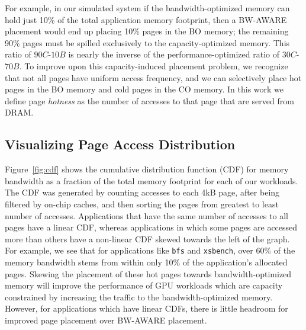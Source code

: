 For example, in our simulated system if the bandwidth-optimized memory
can hold just 10\% of the total application memory footprint, then a BW-AWARE placement would end up placing
10\% pages in the BO memory; the
remaining 90\% pages must be spilled exclusively to the capacity-optimized memory.  This ratio of
$90C$-$10B$ is nearly the inverse of the performance-optimized ratio of $30C$-$70B$.  
To improve upon this capacity-induced placement problem, we recognize
that not all pages have uniform access frequency, and we can selectively place
hot pages in the BO memory and cold pages in the CO memory. 
{\color{black}In this work we define page \textit{hotness} as the number of accesses to that page that 
are served from DRAM.}


\subsection{Visualizing Page Access Distribution}
\label{annotation}
Figure~\ref{fig:cdf} shows the cumulative distribution function (CDF) 
for memory bandwidth as a fraction of the total
memory footprint for each of our workloads. The CDF was generated by counting
accesses to each 4kB page, after being filtered by on-chip caches, and then sorting
the pages from greatest to least number of accesses.
Applications that have the same number of accesses to all
pages have a linear CDF, whereas applications in which some pages are accessed
more than others have a non-linear CDF skewed towards the left of the
graph. For example, we see that for applications like {\tt bfs} and {\tt xsbench}, over 60\% of
the memory bandwidth stems from within only 10\% of the application's allocated pages.  Skewing the 
placement of these hot pages towards bandwidth-optimized memory will improve the performance
of GPU workloads which are capacity constrained by increasing the traffic to the bandwidth-optimized 
memory. However, for applications which have linear CDFs, there is little headroom for 
improved page placement over BW-AWARE placement.


